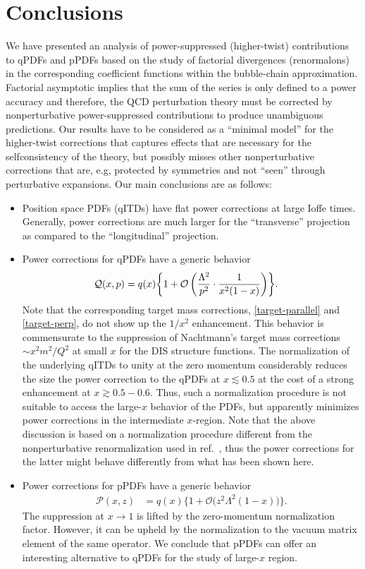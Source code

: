 \section{Conclusions}
%

We have presented an analysis of power-suppressed (higher-twist) contributions to qPDFs and pPDFs based on the study of factorial divergences (renormalons) in the corresponding coefficient functions within the bubble-chain approximation. Factorial asymptotic implies that the sum of the series is only defined to a power accuracy and therefore, the QCD perturbation theory must be corrected by nonperturbative power-suppressed contributions to produce unambiguous predictions. Our results have to be considered as a ``minimal model'' for the higher-twist corrections that captures effects that are necessary for the selfconsistency of the theory, but possibly misses other nonperturbative corrections that are, e.g, protected 
by symmetries and not ``seen'' through perturbative expansions. Our main conclusions are as follows:
\begin{itemize}
\item Position space PDFs (qITDs) have flat power corrections at large Ioffe times. Generally, power corrections are much 
      larger for the ``transverse'' projection as compared to the ``longitudinal'' projection. 
\item Power corrections for qPDFs have a generic behavior
\begin{align}
  \mathcal{Q} (x,p) &=  q(x) \biggl\{1 + \mathcal{O}\left( \frac{\Lambda^2}{p^2}\cdot\frac{1}{{x^2(1-x)}}\right) \biggr\}.     
\end{align}
Note that the corresponding target mass corrections, \eqref{target-parallel} and \eqref{target-perp}, do not show up the  $1/x^2$ enhancement. This behavior is commensurate to the suppression of Nachtmann's target mass corrections $\sim x^2 m^2/Q^2$ at small $x$ for the DIS structure functions. The normalization of the underlying qITDs to unity at the zero momentum considerably reduces the size the power correction to the qPDFs at $ x \lesssim 0.5$ at the cost of a strong enhancement at $x\gtrsim 0.5-0.6$. Thus, such a normalization procedure is not suitable to access the large-$x$ behavior of the PDFs, but apparently minimizes power corrections in the intermediate $x$-region. Note that the above discussion is based on a normalization procedure different from the nonperturbative renormalization used in ref.~\cite{Chen:2018xof}, thus the power corrections for the latter might behave differently from what has been shown here.
 \item
Power corrections for pPDFs have a generic behavior
\begin{align}
\mathcal{P}(x,z) &= q(x)\Big\{1 + \mathcal{O}\big( z^2\!\Lambda^2{(1-x)}\big)\Big\}.
\end{align}
The suppression at $x\to 1$ is lifted by the zero-momentum normalization factor. However, it can be upheld by the normalization to the vacuum matrix element of the same operator. We conclude that pPDFs can offer an interesting alternative to qPDFs for the study of large-$x$ region.
\end{itemize}
